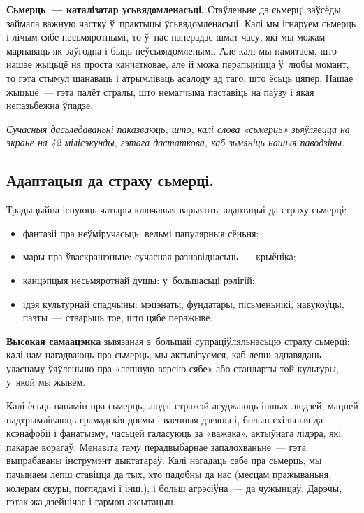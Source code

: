 \textbf{Сьмерць~--- каталізатар усьвядомленасьці.} Стаўленьне да сьмерці заўсёды займала важную частку ў~практыцы ўсьвядомленасьці. Калі мы ігнаруем сьмерць і лічым сябе несьмяротнымі, то ў~нас наперадзе шмат часу, які мы можам марнаваць як заўгодна і быць неўсьвядомленымі. Але калі мы памятаем, што нашае жыцьцё ня проста канчатковае, але й можа перапыніцца ў~любы момант, то гэта стымул шанаваць і атрымліваць асалоду ад таго, што ёсьць цяпер. Нашае жыцьцё~--- гэта палёт стралы, што немагчыма паставіць на паўзу і якая непазьбежна ўпадзе.

\emph{Сучасныя дасьледаваньні паказваюць, што, калі слова «сьмерць» зьяўляецца на экране на 42 мілісэкунды, гэтага дастаткова, каб зьмяніць нашыя паводзіны.} 

\subsection*{Адаптацыя да страху сьмерці.}

Традыцыйна існуюць чатыры ключавыя варыянты адаптацыі да страху сьмерці: 
\begin{itemize}
  \item фантазіі пра неўміручасьць: вельмі папулярныя сёньня;
  \item мары пра ўваскрашэньне: сучасная разнавіднасьць~--- крыёніка;
  \item канцэпцыя несьмяротнай душы: у~большасьці рэлігій;
  \item ідэя культурнай спадчыны: мэцэнаты, фундатары, пісьменьнікі, навукоўцы, паэты~--- стварыць тое, што цябе перажыве.
\end{itemize}

\textbf{Высокая самаацэнка} зьвязаная з~большай супраціўляльнасьцю страху сьмерці: калі нам нагадваюць пра сьмерць, мы актывізуемся, каб лепш адпавядаць уласнаму ўяўленьню пра «лепшую версію сябе» або стандарты той культуры, у~якой мы жывём.

Калі ёсьць напамін пра сьмерць, людзі стражэй асуджаюць іншых людзей, мацней падтрымліваюць грамадскія догмы і ваенныя дзеяньні, больш схільныя да ксэнафобіі і фанатызму, часьцей галасуюць за «важака», актыўнага лідэра, які пакарае ворагаў. Менавіта таму перадвыбарнае запалохваньне~--- гэта выпрабаваны інструмэнт дыктатараў. Калі нагадаць сабе пра сьмерць, мы пачынаем лепш ставіцца да тых, хто падобны да нас (месцам пражываньня, колерам скуры, поглядамі і інш.), і больш агрэсіўна~--- да чужынцаў. Дарэчы, гэтак жа дзейнічае і гармон аксытацын. 

